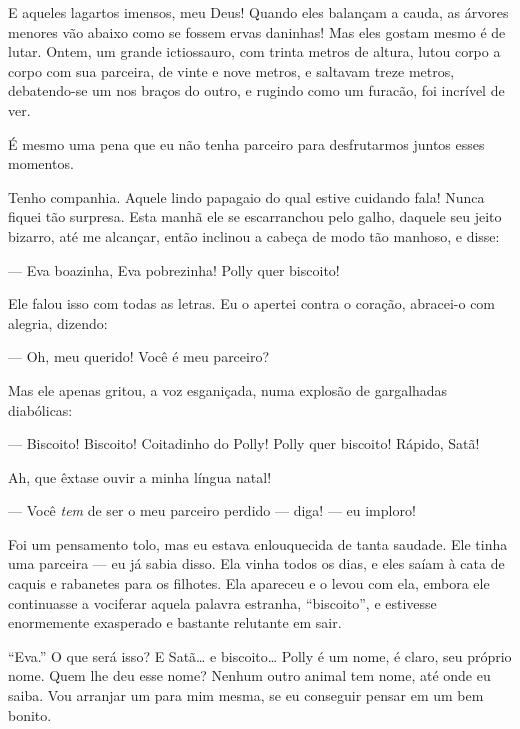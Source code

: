 E aqueles lagartos imensos, meu Deus! Quando eles balançam a cauda, as árvores menores vão abaixo como se fossem ervas daninhas!
Mas eles gostam mesmo é de lutar. Ontem, um grande ictiossauro, com trinta metros de altura, lutou corpo a corpo com sua parceira,
de vinte e nove metros, e saltavam treze metros, debatendo-se um nos braços do outro, e rugindo como um furacão, foi incrível de ver.

É mesmo uma pena que eu não tenha parceiro para desfrutarmos juntos esses momentos.

\sectionitem

 Tenho companhia. Aquele lindo papagaio do qual estive cuidando fala! Nunca fiquei tão surpresa. Esta manhã
ele se escarranchou pelo galho, daquele seu jeito bizarro, até me alcançar, então inclinou a cabeça de modo tão manhoso,
e disse:

--- Eva boazinha, Eva pobrezinha! Polly quer biscoito!     

Ele falou isso com todas as letras. Eu o apertei contra o coração, abracei-o com alegria, dizendo:

--- Oh, meu querido! Você é meu parceiro?

Mas ele apenas gritou, a voz esganiçada, numa explosão de gargalhadas diabólicas:

--- Biscoito! Biscoito! Coitadinho do Polly! Polly quer biscoito! Rápido, Satã!

Ah, que êxtase ouvir a minha língua natal!

--- Você \textit{tem} de ser o meu parceiro perdido --- diga! --- eu imploro!

Foi um pensamento tolo, mas eu estava enlouquecida de tanta saudade. Ele tinha uma parceira ---
eu já sabia disso. Ela vinha todos os dias, e eles saíam à cata de caquis e rabanetes para os filhotes. Ela apareceu e
o levou com ela, embora ele continuasse a vociferar aquela palavra estranha, ``biscoito'', e estivesse enormemente exasperado e
bastante relutante em sair.

``Eva.'' O que será isso? E Satã\ldots{} e biscoito\ldots{} Polly é um nome, é claro, seu próprio nome. Quem lhe deu esse nome? Nenhum outro animal
tem nome, até onde eu saiba. Vou arranjar um para mim mesma, se eu conseguir pensar em um bem bonito.


